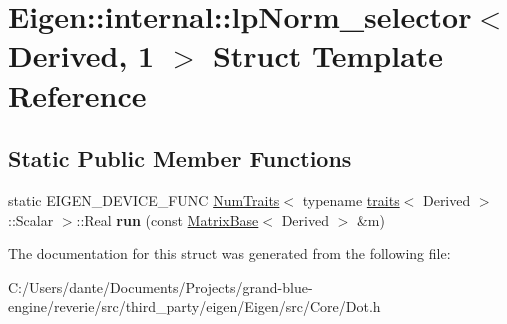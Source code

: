 \hypertarget{struct_eigen_1_1internal_1_1lp_norm__selector_3_01_derived_00_011_01_4}{}\section{Eigen\+::internal\+::lp\+Norm\+\_\+selector$<$ Derived, 1 $>$ Struct Template Reference}
\label{struct_eigen_1_1internal_1_1lp_norm__selector_3_01_derived_00_011_01_4}
\subsection*{Static Public Member Functions}
\begin{DoxyCompactItemize}
\item 
\mbox{\label{struct_eigen_1_1internal_1_1lp_norm__selector_3_01_derived_00_011_01_4_a7e850eb01b8f6b5e84d1a11d0236a348}} 
static E\+I\+G\+E\+N\+\_\+\+D\+E\+V\+I\+C\+E\+\_\+\+F\+U\+NC \mbox{\hyperlink{struct_eigen_1_1_num_traits}{Num\+Traits}}$<$ typename \mbox{\hyperlink{struct_eigen_1_1internal_1_1traits}{traits}}$<$ Derived $>$\+::Scalar $>$\+::Real {\bfseries run} (const \mbox{\hyperlink{class_eigen_1_1_matrix_base}{Matrix\+Base}}$<$ Derived $>$ \&m)
\end{DoxyCompactItemize}


The documentation for this struct was generated from the following file\+:\begin{DoxyCompactItemize}
\item 
C\+:/\+Users/dante/\+Documents/\+Projects/grand-\/blue-\/engine/reverie/src/third\+\_\+party/eigen/\+Eigen/src/\+Core/Dot.\+h\end{DoxyCompactItemize}
